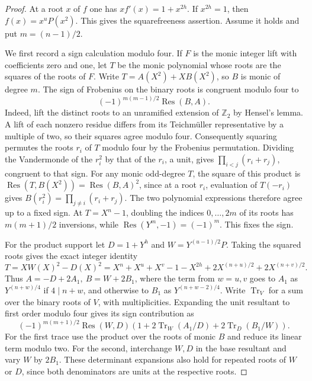 \documentclass[11pt]{article}
\begin{document}
\begin{proof}
At a root \(x\) of \(f\) one has \(xf'(x)=1+x^{2h}\).
If \(x^{2h}=1\), then \(f(x)=x^uP(x^2)\). This gives the
squarefreeness assertion. Assume it holds and put \(m=(n-1)/2\).

We first record a sign calculation modulo four. If \(F\) is the
monic integer lift with coefficients zero and one, let \(T\) be the
monic polynomial whose roots are the squares of the roots of \(F\).
Write \(T=A(X^2)+XB(X^2)\), so \(B\) is monic of degree \(m\).
The sign of Frobenius on the binary roots is congruent modulo four to
\[
 (-1)^{m(m-1)/2}\operatorname{Res}(B,A).
\]
Indeed, lift the distinct roots to an unramified extension of
\(\mathbb Z_2\) by Hensel's lemma. A lift of each nonzero residue
differs from its Teichm\"uller representative by a multiple of two,
so their squares agree modulo four. Consequently squaring permutes
the roots \(r_i\) of \(T\) modulo four by the Frobenius permutation.
Dividing the Vandermonde of the \(r_i^2\) by that of the \(r_i\),
a unit, gives \(\prod_{i<j}(r_i+r_j)\), congruent to that sign.
For any monic odd-degree \(T\), the square of this product is
\(\operatorname{Res}(T,B(X^2))=\operatorname{Res}(B,A)^2\), since
at a root \(r_i\), evaluation of \(T(-r_i)\) gives
\(B(r_i^2)=\prod_{j\ne i}(r_i+r_j)\).
The two polynomial expressions therefore agree up to a fixed sign.
At \(T=X^n-1\), doubling the indices \(0,\ldots,2m\) of its
roots has \(m(m+1)/2\) inversions, while
\(\operatorname{Res}(Y^m,-1)=(-1)^m\). This fixes the sign.

For the product support let \(D=1+Y^h\) and \(W=Y^{(u-1)/2}P\).
Taking the squared roots gives the exact integer identity
\[
 T=XW(X)^2-D(X)^2
   =X^n+X^u+X^v-1-X^{2h}
     +2X^{(n+u)/2}+2X^{(n+v)/2}.
\]
Thus \(A=-D+2A_1,\ B=W+2B_1\), where the term from \(w=u,v\)
goes to \(A_1\) as \(Y^{(n+w)/4}\) if \(4\mid n+w\), and
otherwise to \(B_1\) as \(Y^{(n+w-2)/4}\).
Write \(\operatorname{Tr}_V\) for a sum over the binary roots of
\(V\), with multiplicities. Expanding the unit resultant to first
order modulo four gives its sign contribution as
\[
 (-1)^{m(m+1)/2}\operatorname{Res}(W,D)
 \left(1+2\operatorname{Tr}_{W}(A_1/D)
         +2\operatorname{Tr}_{D}(B_1/W)\right).
\]
For the first trace use the product over the roots of monic \(B\)
and reduce its linear term modulo two. For the second, interchange
\(W,D\) in the base resultant and vary \(W\) by \(2B_1\).
These determinant expansions also hold for repeated roots of \(W\)
or \(D\), since both denominators are units at the respective roots.


\end{proof}
\end{document}
